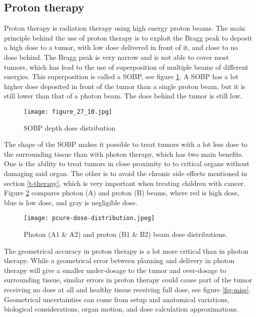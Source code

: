 \documentclass[../main/thesis.tex]{subfiles}
\begin{document}

\subsection{Proton therapy}
\label{t-proton}
Proton therapy is radiation therapy using high energy proton beams. The main principle behind the use of proton therapy is to exploit the Bragg peak to deposit a high dose to a tumor, with low dose delivered in front of it, and close to no dose behind. The Bragg peak is very narrow and is not able to cover most tumors, which has lead to the use of superposition of multiple beams of different energies. This superposition is called a \gls{SOBP}, see figure \ref{fig-sobp}. A \gls{SOBP} has a lot higher dose deposited in front of the tumor than a single proton beam, but it is still lower than that of a photon beam. The dose behind the tumor is still low. \citep[chap. 27]{Khan}

\begin{figure}%
	\centering
	\texttt{[image: figure\_27\_10.jpg]}
	\caption{\gls{SOBP} depth dose distribution \citep[fig. 27.10]{Khan}}
	\label{fig-sobp}
\end{figure}


The shape of the \gls{SOBP} makes it possible to treat tumors with a lot less dose to the surrounding tissue than with photon therapy, which has two main benefits. One is the ability to treat tumors in close proximity to to critical organs without damaging said organ. The other is to avoid the chronic side effects mentioned in section \ref{t-therapy}, which is very important when treating children with cancer. \citep[chap. 27]{Khan} Figure \ref{fig-photonproton-dose} compares photon (A) and proton (B) beams, where red is high dose, blue is low dose, and gray is negligible dose. 

\begin{figure}%
	\centering
	\texttt{[image: pcure-dose-distribution.jpeg]}
	\caption{Photon (A1 \& A2) and proton (B1 \& B2) beam dose distributions. \citetext{\citeauthor{pcure}}}
	\label{fig-photonproton-dose}
\end{figure}

The geometrical accuracy in proton therapy is a lot more critical than in photon therapy. While a geometrical error between planning and delivery in photon therapy will give a smaller under-dosage to the tumor and over-dosage to surrounding tissue, similar errors in proton therapy could cause part of the tumor receiving no dose at all and healthy tissue receiving full dose, see figure \ref{fig-miss}. Geometrical uncertainties can come from setup and anatomical variations, biological considerations, organ motion, and dose calculation approximations. \citep{Paganetti-range} 
\end{document}
